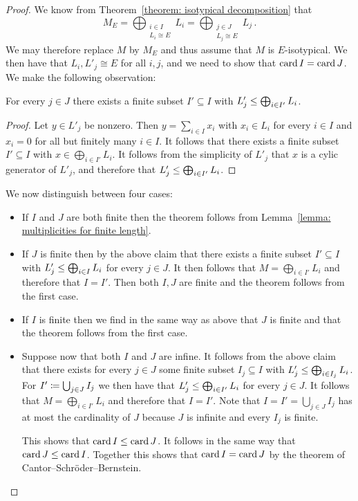 \begin{proof}
  We know from Theorem~\ref{theorem: isotypical decomposition} that
  \[
      M_E
    = \bigoplus_{\substack{i \in I \\ L_i \cong E}} L_i
    = \bigoplus_{\substack{j \in J \\ L_j \cong E}} L_j \,.
  \]
  We may therefore replace $M$ by $M_E$ and thus assume that $M$ is $E$-isotypical.
  We then have that $L_i, L'_j \cong E$ for all $i, j$, and we need to show that $\operatorname{card}{I} = \operatorname{card}{J}$.
  We make the following observation:
  
  \begin{claim}
    For every $j \in J$ there exists a finite subset $I' \subseteq I$ with $L'_j \leq \bigoplus_{i \in I'} L_i$.
  \end{claim}
  
  \begin{proof}
    Let $y \in L'_j$ be nonzero.
    Then $y = \sum_{i \in I} x_i$ with $x_i \in L_i$ for every $i \in I$ and $x_i = 0$ for all but finitely many $i \in I$.
    It follows that there exists a finite subset $I' \subseteq I$ with $x \in \bigoplus_{i \in I'} L_i$.
    It follows from the simplicity of $L'_j$ that $x$ is a cylic generator of $L'_j$, and therefore that $L'_j \leq \bigoplus_{i \in I'} L_i$.
  \end{proof}
  
  We now distinguish between four cases:
  \begin{itemize}
    \item 
      If $I$ and $J$ are both finite then the theorem follows from Lemma~\ref{lemma: multiplicities for finite length}.
    \item
      If $J$ is finite then by the above claim that there exists a finite subset $I' \subseteq I$ with $L'_j \leq \bigoplus_{i \in I} L_i$ for every $j \in J$.
      It then follows that $M = \bigoplus_{i \in I'} L_i$ and therefore that $I = I'$.
      Then both $I, J$ are finite and the theorem follows from the first case.
    \item
      If $I$ is finite then we find in the same way as above that $J$ is finite and that the theorem follows from the first case.
    \item
      Suppose now that both $I$ and $J$ are infine.
      It follows from the above claim that there exists for every $j \in J$ some finite subset $I_j \subseteq I$ with $L'_j \leq \bigoplus_{i \in I_j} L_i$.
      For $I' \coloneqq \bigcup_{j \in J} I_j$ we then have that $L'_j \leq \bigoplus_{i \in I'} L_i$ for every $j \in J$.
      It follows that $M = \bigoplus_{i \in I'} L_i$ and therefore that $I = I'$.
      Note that $I = I' = \bigcup_{j \in J} I_j$ has at most the cardinality of $J$ because $J$ is infinite and every $I_j$ is finite.
      
      This shows that $\operatorname{card}{I} \leq \operatorname{card}{J}$.
      It follows in the same way that $\operatorname{card}{J} \leq \operatorname{card}{I}$.
      Together this shows that $\operatorname{card}{I} = \operatorname{card}{J}$ by the theorem of Cantor--Schröder--Bernstein.
    \qedhere
  \end{itemize}
\end{proof}


